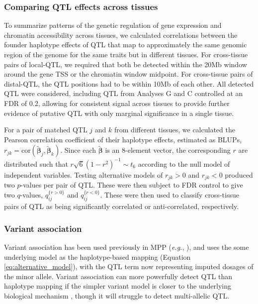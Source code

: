 \documentclass[9pt,twocolumn,twoside]{gsajnl}
\newcommand{\eg}{\emph{e.g.}\xspace}
\newcommand{\bbeta}{\boldsymbol{\beta}}
\newcommand{\blup}{\widetilde{\bbeta}}
\newcommand{\GK}[2]{\textcolor{teal}{#1\footnote{\textcolor{teal}{GK: #2}}}}
\begin{document}
\subsubsection{Comparing QTL effects across tissues}

To summarize patterns of the genetic regulation of gene expression and chromatin accessibility across tissues, we calculated correlations between the founder haplotype effects of QTL that map to approximately the same genomic region of the genome for the same traits but in different tissues. For cross-tissue pairs of local-QTL, we required that both be detected within the 20Mb window around the gene TSS or the chromatin window midpoint. For cross-tissue pairs of distal-QTL, the QTL positions had to be within 10Mb of each other. All detected QTL were considered, including QTL from Analyses G and C controlled at an FDR of 0.2, allowing for consistent signal across tissues to provide further evidence of putative QTL with only marginal significance in a single tissue.

For a pair of matched QTL $j$ and $k$ from different tissues, we calculated the Pearson correlation coefficient of their haplotype effects, estimated as BLUPs, $r_{jk} = \text{cor}(\blup_j, \blup_k)$. Since each $\blup$ is an 8-element vector, the corresponding $r$ are distributed such that $r\sqrt{6}(1 - r^{2})^{-1} \sim t_{6}$ according to the null model of independent variables. Testing alternative models of $r_{jk} > 0$ and $r_{jk} < 0$ produced two $p$-values per pair of QTL. These were then subject to FDR control \citep{Benjamini1995} to give two $q$-values, $q_{ij}^{\{r > 0\}}$ and $q_{ij}^{\{r < 0\}}$. These were then used to classify cross-tissue pairs of QTL as being significantly correlated or anti-correlated, respectively. 

\subsubsection{Variant association}

Variant association has been used previously in MPP (\eg, \citealt{Baud2014, Keele2018}), and uses the some underlying model as the haplotype-based mapping (Equation \ref{eq:alternative_model}), with the QTL term now representing imputed dosages of the minor allele. Variant association can more powerfully detect QTL than haplotype mapping if the simpler variant model is closer to the underlying biological mechanism \citep{Yalcin2005}, though it will struggle to detect multi-allelic QTL.
\end{document}
